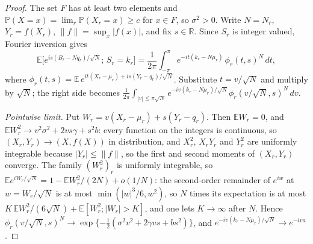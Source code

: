 \documentclass[11pt]{amsart}
\theoremstyle{definition}
\newcommand{\R}{\mathbb{R}}
\newcommand{\E}{\mathbb{E}}
\newcommand{\Prob}{\mathbb{P}}
\begin{document}
\begin{proof}
The set $F$ has at least two elements and $\Prob(X=x)=\lim_r\Prob(X_r=x)\ge c$ for $x\in F$, so $\sigma^2>0$. Write $N=N_r$, $Y_r=f(X_r)$, $\|f\|=\sup_x|f(x)|$, and fix $s\in\R$. Since $S_r$ is integer valued, Fourier inversion gives
\begin{equation}\label{eq:inv}
\E\Big[e^{is(B_r-Nq_r)/\sqrt N};\,S_r=k_r\Big]
=\frac1{2\pi}\int_{-\pi}^{\pi}e^{-it(k_r-N\mu_r)}\,\phi_r(t,s)^N\,dt,
\end{equation}
where $\phi_r(t,s)=\E\,e^{it(X_r-\mu_r)+is(Y_r-q_r)/\sqrt N}$.
Substitute $t=v/\sqrt N$ and multiply by $\sqrt N$; the right side becomes $\frac1{2\pi}\int_{|v|\le\pi\sqrt N}e^{-iv(k_r-N\mu_r)/\sqrt N}\phi_r(v/\sqrt N,s)^N\,dv$.

\emph{Pointwise limit.} Put $W_r=v(X_r-\mu_r)+s(Y_r-q_r)$. Then $\E W_r=0$, and $\E W_r^2\to v^2\sigma^2+2vs\gamma+s^2b$: every function on the integers is continuous, so $(X_r,Y_r)\to(X,f(X))$ in distribution, and $X_r^2$, $X_rY_r$ and $Y_r^2$ are uniformly integrable because $|Y_r|\le\|f\|$, so the first and second moments of $(X_r,Y_r)$ converge. The family $(W_r^2)_r$ is uniformly integrable, so $\E e^{iW_r/\sqrt N}=1-\E W_r^2/(2N)+o(1/N)$: the second-order remainder of $e^{iw}$ at $w=W_r/\sqrt N$ is at most $\min(|w|^3/6,w^2)$, so $N$ times its expectation is at most $K\,\E W_r^2/(6\sqrt N)+\E[W_r^2;|W_r|>K]$, and one lets $K\to\infty$ after $N$. Hence $\phi_r(v/\sqrt N,s)^N\to\exp\{-\tfrac12(\sigma^2v^2+2\gamma vs+bs^2)\}$, and $e^{-iv(k_r-N\mu_r)/\sqrt N}\to e^{-iva}$.


\end{proof}
\end{document}
